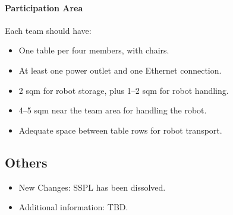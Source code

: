 \paragraph{Participation Area} Each team should have:
\begin{itemize}
    \item One table per four members, with chairs.
    \item At least one power outlet and one Ethernet connection.
    \item 2 sqm for robot storage, plus 1--2 sqm for robot handling.
    \item 4--5 sqm near the team area for handling the robot.
    \item Adequate space between table rows for robot transport.
\end{itemize}

\subsection{Others}
\begin{itemize}
    \item New Changes: SSPL has been dissolved.
    \item Additional information: TBD.
\end{itemize}

